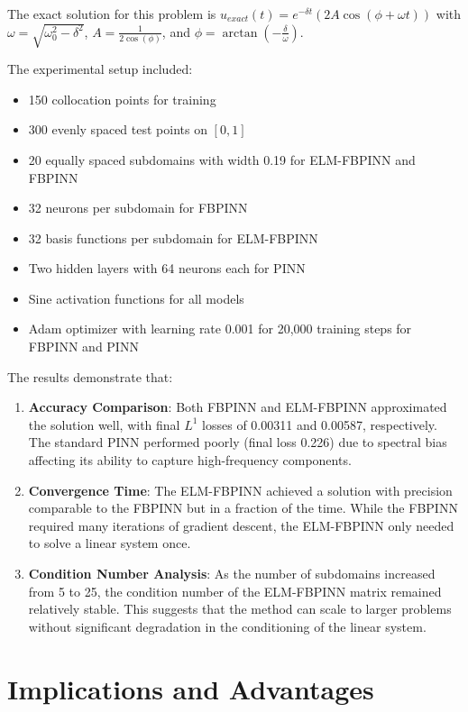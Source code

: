 \documentclass[11pt]{article}
\begin{document}
The exact solution for this problem is $u_{exact}(t) = e^{-\delta t}(2A\cos(\phi+\omega t))$ with $\omega = \sqrt{\omega_0^2-\delta^2}$, $A = \frac{1}{2\cos(\phi)}$, and $\phi = \arctan(-\frac{\delta}{\omega})$.

The experimental setup included:
\begin{itemize}
    \item 150 collocation points for training
    \item 300 evenly spaced test points on $[0,1]$
    \item 20 equally spaced subdomains with width 0.19 for ELM-FBPINN and FBPINN
    \item 32 neurons per subdomain for FBPINN
    \item 32 basis functions per subdomain for ELM-FBPINN
    \item Two hidden layers with 64 neurons each for PINN
    \item Sine activation functions for all models
    \item Adam optimizer with learning rate 0.001 for 20,000 training steps for FBPINN and PINN
\end{itemize}

The results demonstrate that:

\begin{enumerate}
    \item \textbf{Accuracy Comparison}: Both FBPINN and ELM-FBPINN approximated the solution well, with final $L^1$ losses of 0.00311 and 0.00587, respectively. The standard PINN performed poorly (final loss 0.226) due to spectral bias affecting its ability to capture high-frequency components.
    
    \item \textbf{Convergence Time}: The ELM-FBPINN achieved a solution with precision comparable to the FBPINN but in a fraction of the time. While the FBPINN required many iterations of gradient descent, the ELM-FBPINN only needed to solve a linear system once.
    
    \item \textbf{Condition Number Analysis}: As the number of subdomains increased from 5 to 25, the condition number of the ELM-FBPINN matrix remained relatively stable. This suggests that the method can scale to larger problems without significant degradation in the conditioning of the linear system.
\end{enumerate}

\section{Implications and Advantages}
\end{document}
